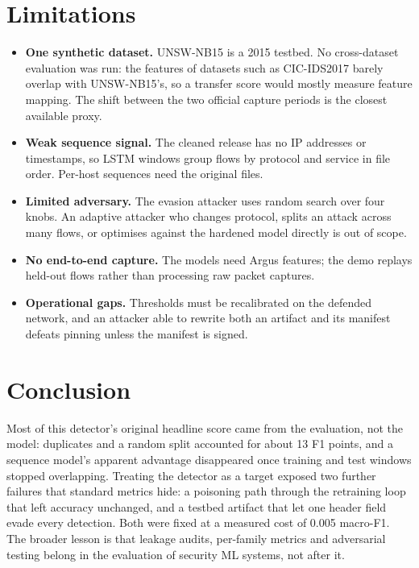 \documentclass[11pt,a4paper]{article}
\begin{document}
\section{Limitations}
\label{sec:limits}

\begin{itemize}
  \item \textbf{One synthetic dataset.} UNSW-NB15 is a 2015 testbed. No
        cross-dataset evaluation was run: the features of datasets such as
        CIC-IDS2017 barely overlap with UNSW-NB15's, so a transfer score
        would mostly measure feature mapping. The shift between the two
        official capture periods is the closest available proxy.
  \item \textbf{Weak sequence signal.} The cleaned release has no IP
        addresses or timestamps, so LSTM windows group flows by protocol and
        service in file order. Per-host sequences need the original files.
  \item \textbf{Limited adversary.} The evasion attacker uses random search
        over four knobs. An adaptive attacker who changes protocol, splits
        an attack across many flows, or optimises against the hardened model
        directly is out of scope.
  \item \textbf{No end-to-end capture.} The models need Argus features; the
        demo replays held-out flows rather than processing raw packet
        captures.
  \item \textbf{Operational gaps.} Thresholds must be recalibrated on the
        defended network, and an attacker able to rewrite both an artifact
        and its manifest defeats pinning unless the manifest is signed.
\end{itemize}

\section{Conclusion}

Most of this detector's original headline score came from the evaluation,
not the model: duplicates and a random split accounted for about 13 F1
points, and a sequence model's apparent advantage disappeared once training
and test windows stopped overlapping. Treating the detector as a target
exposed two further failures that standard metrics hide: a poisoning path
through the retraining loop that left accuracy unchanged, and a testbed
artifact that let one header field evade every detection. Both were fixed
at a measured cost of 0.005 macro-F1. The broader lesson is that leakage
audits, per-family metrics and adversarial testing belong in the evaluation
of security ML systems, not after it.
\end{document}
